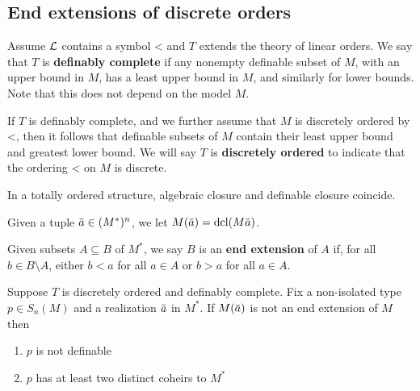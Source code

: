 \documentclass[11pt]{article}
\begin{document}
\subsection{End extensions of discrete orders}
\label{sec:org0438f2b}
Assume \(\mathcal{L}\) contains a symbol < and \(T\) extends the theory of linear orders. We say
that \(T\) is \textbf{definably complete} if any nonempty definable subset
of \(M\), with an upper bound in \(M\), has a least upper bound in \(M\), and similarly for
lower bounds. Note that this does not depend on the model \(M\).

If \(T\) is definably complete, and we further assume that \(M\) is discretely ordered by <,
then it follows that definable subsets of \(M\) contain their least upper bound and greatest
lower bound. We will say \(T\) is \textbf{discretely ordered} to indicate that the ordering < on \(M\) is
discrete.

In a totally ordered structure, algebraic closure and definable closure coincide.

Given a tuple \(\bara\in(M^*)^n\), we let \(M(\bara)=\dcl(M\bara)\).

\begin{definition}[]
Given subsets \(A\subseteq B\) of \(M^*\), we say \(B\) is an \textbf{end extension} of \(A\) if, for
all \(b\in B\setminus A\), either \(b<a\) for all \(a\in A\) or \(b>a\) for all \(a\in A\).
\end{definition}

\begin{lemma}[]
\label{0.3}
Suppose \(T\) is discretely ordered and definably complete. Fix a non-isolated
type \(p\in S_n(M)\) and a realization \(\bara\) in \(M^*\). If \(M(\bara)\) is not an end
extension of \(M\) then
\begin{enumerate}
\item \(p\) is not definable
\item \(p\) has at least two distinct coheirs to \(M^*\)
\end{enumerate}
\end{lemma}
\end{document}
